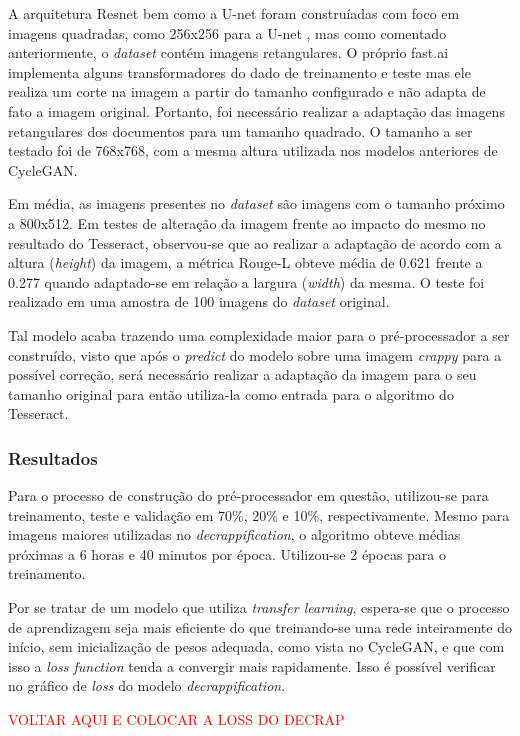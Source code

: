 A arquitetura Resnet bem como a U-net foram construíadas com foco em imagens quadradas, como 256x256 para a U-net \cite{u-net}, mas como comentado anteriormente, o \textit{dataset} contém imagens retangulares. O próprio fast.ai implementa alguns transformadores do dado de treinamento e teste mas ele realiza um corte na imagem a partir do tamanho configurado e não adapta de fato a imagem original. Portanto, foi necessário realizar a adaptação das imagens retangulares dos documentos para um tamanho quadrado. O tamanho a ser testado foi de 768x768, com a mesma altura utilizada nos modelos anteriores de CycleGAN.

Em média, as imagens presentes no \textit{dataset} são imagens com o tamanho próximo a 800x512. Em testes de alteração da imagem frente ao impacto do mesmo no resultado do Tesseract, observou-se que ao realizar a adaptação de acordo com a altura (\textit{height}) da imagem, a métrica Rouge-L obteve média de 0.621 frente a 0.277 quando adaptado-se em relação a largura (\textit{width}) da mesma. O teste foi realizado em uma amostra de 100 imagens do \textit{dataset} original.

Tal modelo acaba trazendo uma complexidade maior para o pré-processador a ser construído, visto que após o \textit{predict} do modelo sobre uma imagem \textit{crappy} para a possível correção, será necessário realizar a adaptação da imagem para o seu tamanho original para então utiliza-la como entrada para o algoritmo do Tesseract.


\subsubsection{Resultados}

Para o processo de construção do pré-processador em questão, utilizou-se para treinamento, teste e validação em 70\%, 20\% e 10\%, respectivamente. Mesmo para imagens maiores utilizadas no \textit{decrappification}, o algoritmo obteve médias próximas a 6 horas e 40 minutos por época. Utilizou-se 2 épocas para o treinamento.

Por se tratar de um modelo que utiliza \textit{transfer learning}, espera-se que o processo de aprendizagem seja mais eficiente do que treinando-se uma rede inteiramente do início, sem inicialização de pesos adequada, como vista no CycleGAN, e que com isso a \textit{loss function} tenda a convergir mais rapidamente. Isso é possível verificar no gráfico de \textit{loss} do modelo \textit{decrappification}.

\textcolor{red}{VOLTAR AQUI E COLOCAR A LOSS DO DECRAP}
